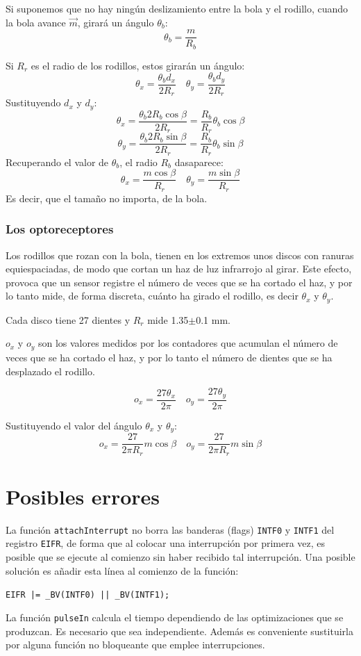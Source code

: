\documentclass[10pt,a4paper,hidelinks]{article}
\begin{document}
\begin{multicols}{2}
Si suponemos que no hay ningún deslizamiento entre la bola y el rodillo, cuando 
la bola avance $\vec{m}$, girará un ángulo $\theta_b$:
$$ \theta_b = \frac{m}{R_b} $$

Si $R_r$ es el radio de los rodillos, estos girarán un ángulo:
$$ \theta_x = \frac{\theta_b d_x}{2R_r} \quad
	\theta_y = \frac{\theta_b d_y}{2R_r}$$
Sustituyendo $d_x$ y $d_y$:
$$ \theta_x = \frac{\theta_b 2R_b\cos \beta}{2R_r} =
	\frac{R_b}{R_r}\theta_b\cos \beta$$
$$ \theta_y = \frac{\theta_b 2R_b\sin \beta}{2R_r} =
	\frac{R_b}{R_r}\theta_b\sin \beta$$
Recuperando el valor de $\theta_b$, el radio $R_b$ dasaparece:
$$ \theta_x = \frac{m \cos \beta}{R_r} \quad
\theta_y = \frac{m \sin \beta}{R_r} $$
Es decir, que el tamaño no importa, de la bola.

\subsubsection{Los optoreceptores}

Los rodillos que rozan con la bola, tienen en los extremos unos discos con
ranuras equiespaciadas, de modo que cortan un haz de luz infrarrojo al girar.  
Este efecto, provoca que un sensor registre el número de veces que se ha cortado 
el haz, y por lo tanto mide, de forma discreta, cuánto ha girado el rodillo, es 
decir $\theta_x$ y $\theta_y$.

Cada disco tiene 27 dientes y $R_r$ mide 1.35$\pm$0.1 mm.

$o_x$ y $o_y$ son los valores medidos por los contadores que acumulan el número 
de veces que se ha cortado el haz, y por lo tanto el número de dientes que se ha 
desplazado el rodillo.

$$o_x = \frac{27 \theta_x}{2\pi} \quad o_y = \frac{27 \theta_y}{2\pi}$$

Sustituyendo el valor del ángulo $\theta_x$ y $\theta_y$:
$$ o_x = \frac{27}{2 \pi R_r} m \cos \beta \quad
	o_y = \frac{27}{2 \pi R_r} m \sin \beta $$


\section{Posibles errores}

La función \texttt{attachInterrupt} no borra las banderas (flags) \texttt{INTF0} 
y \texttt{INTF1} del registro \texttt{EIFR}, de forma que al colocar una 
interrupción por primera vez, es posible que se ejecute al comienzo sin haber 
recibido tal interrupción. Una posible solución es añadir esta línea al comienzo 
de la función:

\texttt{EIFR |= \_BV(INTF0) || \_BV(INTF1);}

La función \texttt{pulseIn} calcula el tiempo dependiendo de las optimizaciones
que se produzcan. Es necesario que sea independiente. Además es conveniente
sustituirla por alguna función no bloqueante que emplee interrupciones.



\end{multicols}
\end{document}
